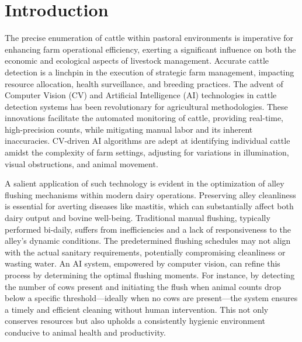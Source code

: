 \section{Introduction}

The precise enumeration of cattle within pastoral environments is imperative for enhancing farm operational efficiency, exerting a significant influence on both the economic and ecological aspects of livestock management. Accurate cattle detection is a linchpin in the execution of strategic farm management, impacting resource allocation, health surveillance, and breeding practices. The advent of Computer Vision (CV) and Artificial Intelligence (AI) technologies in cattle detection systems has been revolutionary for agricultural methodologies. These innovations facilitate the automated monitoring of cattle, providing real-time, high-precision counts, while mitigating manual labor and its inherent inaccuracies. CV-driven AI algorithms are adept at identifying individual cattle amidst the complexity of farm settings, adjusting for variations in illumination, visual obstructions, and animal movement.

A salient application of such technology is evident in the optimization of alley flushing mechanisms within modern dairy operations. Preserving alley cleanliness is essential for averting diseases like mastitis, which can substantially affect both dairy output and bovine well-being. Traditional manual flushing, typically performed bi-daily, suffers from inefficiencies and a lack of responsiveness to the alley's dynamic conditions. The predetermined flushing schedules may not align with the actual sanitary requirements, potentially compromising cleanliness or wasting water. An AI system, empowered by computer vision, can refine this process by determining the optimal flushing moments. For instance, by detecting the number of cows present and initiating the flush when animal counts drop below a specific threshold—ideally when no cows are present—the system ensures a timely and efficient cleaning without human intervention. This not only conserves resources but also upholds a consistently hygienic environment conducive to animal health and productivity.


